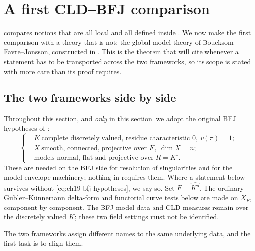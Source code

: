 \section{A first CLD--BFJ comparison}
\label{sec:ch19-cld-bfj}

 compares notions that are all local and all
defined inside .  We now make the first comparison with a
theory that is not: the global model theory of Boucksom--Favre--Jonsson,
constructed in .  This is the theorem that
 will cite whenever a statement has to be transported
across the two frameworks, so its scope is stated with more care than its
proof requires.

\subsection{The two frameworks side by side}
\label{sec:ch19-cld-bfj-setup}

Throughout this section, and \emph{only} in this section, we adopt the
original BFJ hypotheses of :
\begin{equation}
\label{eq:ch19-bfj-hypotheses}
\left\{
\begin{aligned}
 &K\ \text{complete discretely valued, residue characteristic }0,\
   v(\pi)=1;\\
 &X\ \text{smooth, connected, projective over }K,\ \dim X=n;\\
 &\text{models normal, flat and projective over }R=K^\circ .
\end{aligned}
\right.
\end{equation}
These are needed on the BFJ side for resolution of singularities and for the
model-envelope machinery; nothing in \Cref{part:cld} requires them.  Where a
statement below survives without \eqref{eq:ch19-bfj-hypotheses}, we say so.
Set $F=\widehat{K^a}$.  The ordinary Gubler--K\"unnemann delta-form and
functorial curve tests below are made on $X_F$, component by component.
The BFJ model data and CLD measures remain over the discretely valued $K$;
these two field settings must not be identified.

The two frameworks assign different names to the same underlying data, and
the first task is to align them.

